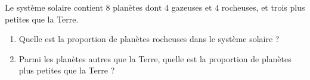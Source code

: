 
\begin{exercice}\label{exo2smath-0318}

    Le système solaire contient \( 8\) planètes dont \( 4\) gazeuses et \( 4\) rocheuses, et trois plus petites que la Terre.
    \begin{enumerate}
        \item
            Quelle est la proportion de planètes rocheuses dans le système solaire ?
        \item
            Parmi les planètes autres que la Terre, quelle est la proportion de planètes plus petites que la Terre ?
    \end{enumerate}

\end{exercice}
